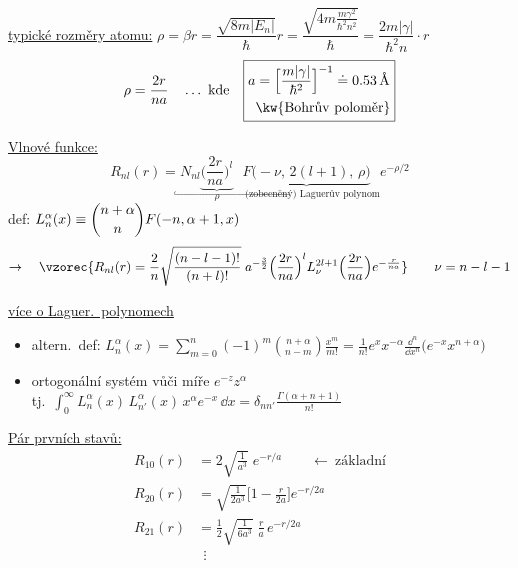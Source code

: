 \underline{typické rozměry atomu:} \quad
$\rho = \beta r = \dfrac{\sqrt{8m|E_n|}}{\hbar}r = \dfrac{\sqrt{4m\frac{m\gamma^2}{\hbar^2n^2}}}{\hbar} = \dfrac{2m|\gamma|}{\hbar^2n}\cdot r$
\[
  \rho = \frac{2r}{na} \quad\dots\ \text{kde}\quad
  \boxed{\begin{aligned} a &= \Big[\frac{m|\gamma|}{\hbar^2}\Big]^{-1} \doteq 0.53\,\text{Å} \\ &\text{\kw{Bohrův poloměr}}\end{aligned}}
\]

\underline{Vlnové funkce:}
\[
  R_{nl}(r) = N_{nl}\underbrace{\Big(\frac{2r}{na}\Big)^l}_{\rho}\underbrace{F\big(-\nu,\,2(l+1),\,\rho\big)}_{\hookrightarrow\ \text{(zobecněný) Laguerův polynom}}e^{-\rho/2}
\]
def: \quad $L_n^\alpha(x) \equiv \dbinom{n+\alpha}{n}F(-n,\alpha+1,x)$
\[
  \to\quad \vzorec{R_{nl}(r) = \frac2n\sqrt{\frac{(n-l-1)!}{(n+l)!}}\;a^{-\frac32}\Big(\frac{2r}{na}\Big)^lL_\nu^{2l+1}\Big(\frac{2r}{na}\Big)e^{-\frac{r}{na}}}
  \qquad \nu = n - l - 1
\]

\underline{více o Laguer.\ polynomech}
\begin{itemize}
  \item altern.\ def: \quad $L_n^\alpha(x) = \displaystyle\sum_{m=0}^{n}(-1)^m\binom{n+\alpha}{n-m}\frac{x^m}{m!} = \frac{1}{n!}e^xx^{-\alpha}\frac{\dd^n}{\dd x^n}\big(e^{-x}x^{n+\alpha}\big)$
  \item ortogonální systém vůči míře $e^{-z}z^\alpha$ \\
  tj.\ \quad $\displaystyle\int_0^\infty L_n^\alpha(x)\,L_{n'}^\alpha(x)\,x^\alpha e^{-x}\,\dd x = \delta_{nn'}\frac{\Gamma(\alpha+n+1)}{n!}$
\end{itemize}

\underline{Pár prvních stavů:}
\begin{align*}
  R_{10}(r) &= 2\sqrt{\tfrac{1}{a^3}}\;e^{-r/a} \qquad\leftarrow\ \text{základní} \\
  R_{20}(r) &= \sqrt{\tfrac{1}{2a^3}}\Big[1 - \frac{r}{2a}\Big]e^{-r/2a} \\
  R_{21}(r) &= \tfrac12\sqrt{\tfrac{1}{6a^3}}\;\frac ra\,e^{-r/2a} \\
  &\ \ \vdots
\end{align*}

